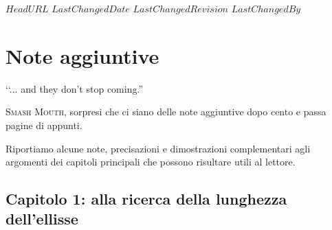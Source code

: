 \svnidlong
{$HeadURL$}
{$LastChangedDate$}
{$LastChangedRevision$}
{$LastChangedBy$}

\chapter{Note aggiuntive}
\begin{introduction}
‘‘... and they don't stop coming.''
\begin{flushright}
	\textsc{Smash Mouth,} sorpresi che ci siano delle note aggiuntive dopo cento e passa pagine di appunti.
\end{flushright}
\end{introduction}

\noindent Riportiamo alcune note, precisazioni e dimostrazioni complementari agli argomenti dei capitoli principali che possono risultare utili al lettore.
\section{Capitolo 1: alla ricerca della lunghezza dell'ellisse}
